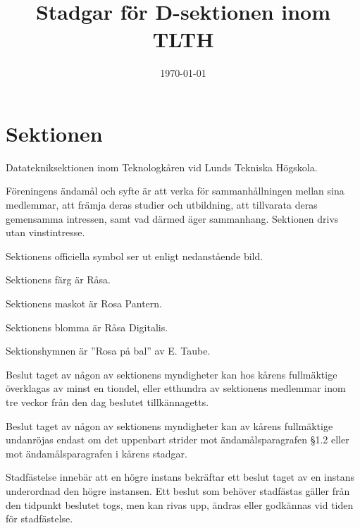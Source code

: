 \documentclass[stadgar]{dsekprotokoll}
\begin{document}
\title{Stadgar för D-sektionen inom TLTH}
\date{\today}

\maketitle

\section{Sektionen}

\begin{stadgeavsnitt}


Datatekniksektionen inom Teknologkåren vid Lunds Tekniska Högskola.


Föreningens ändamål och syfte är att verka för sammanhållningen mellan sina
medlemmar, att främja deras studier och utbildning, att tillvarata deras
gemensamma intressen, samt vad därmed äger sammanhang. Sektionen drivs utan
vinstintresse.


Sektionens officiella symbol ser ut enligt nedanstående bild.

\tthdump{\Dsymbol[10mm]}


Sektionens färg är Råsa.


Sektionens maskot är Rosa Pantern.


Sektionens blomma är Råsa Digitalis.


Sektionshymnen är ''Rosa på bal'' av E. Taube.


Beslut taget av någon av sektionens myndigheter kan hos kårens fullmäktige
överklagas av minst en tiondel, eller etthundra av sektionens medlemmar
inom tre veckor från den dag beslutet tillkännagetts.


Beslut taget av någon av sektionens myndigheter kan av kårens fullmäktige
undanröjas endast om det uppenbart strider mot ändamålsparagrafen \S1.2
eller mot ändamålsparagrafen i kårens stadgar.


Stadfästelse innebär att en högre instans bekräftar ett beslut taget av en instans underordnad den högre instansen. Ett beslut som behöver stadfästas gäller från den tidpunkt beslutet togs, men kan rivas upp, ändras eller godkännas vid tiden för stadfästelse.

\end{stadgeavsnitt}
\end{document}
